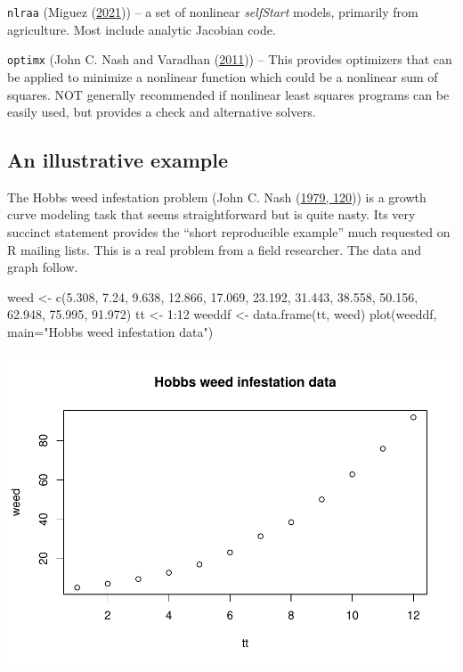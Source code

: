 \documentclass[
]{article}
\newenvironment{Shaded}{\begin{snugshade}}{\end{snugshade}}
\newcommand{\AttributeTok}[1]{\textcolor[rgb]{0.77,0.63,0.00}{#1}}
\newcommand{\DecValTok}[1]{\textcolor[rgb]{0.00,0.00,0.81}{#1}}
\newcommand{\FloatTok}[1]{\textcolor[rgb]{0.00,0.00,0.81}{#1}}
\newcommand{\FunctionTok}[1]{\textcolor[rgb]{0.00,0.00,0.00}{#1}}
\newcommand{\NormalTok}[1]{#1}
\newcommand{\OtherTok}[1]{\textcolor[rgb]{0.56,0.35,0.01}{#1}}
\newcommand{\SpecialCharTok}[1]{\textcolor[rgb]{0.00,0.00,0.00}{#1}}
\newcommand{\StringTok}[1]{\textcolor[rgb]{0.31,0.60,0.02}{#1}}
\begin{document}
\texttt{nlraa} (Miguez (\protect\hyperlink{ref-MiguezNLRAA2021}{2021}))
-- a set of nonlinear \emph{selfStart} models, primarily from
agriculture. Most include analytic Jacobian code.

\texttt{optimx} (John C. Nash and Varadhan
(\protect\hyperlink{ref-p-optimx}{2011})) -- This provides optimizers
that can be applied to minimize a nonlinear function which could be a
nonlinear sum of squares. NOT generally recommended if nonlinear least
squares programs can be easily used, but provides a check and
alternative solvers.

\hypertarget{an-illustrative-example}{%
\subsection{An illustrative example}\label{an-illustrative-example}}

The Hobbs weed infestation problem (John C. Nash
(\protect\hyperlink{ref-cnm79}{1979, 120})) is a growth curve modeling
task that seems straightforward but is quite nasty. Its very succinct
statement provides the ``short reproducible example'' much requested on
R mailing lists. This is a real problem from a field researcher. The
data and graph follow.

\begin{Shaded}
\begin{Highlighting}[]
\NormalTok{weed }\OtherTok{\textless{}{-}} \FunctionTok{c}\NormalTok{(}\FloatTok{5.308}\NormalTok{, }\FloatTok{7.24}\NormalTok{, }\FloatTok{9.638}\NormalTok{, }\FloatTok{12.866}\NormalTok{, }\FloatTok{17.069}\NormalTok{, }\FloatTok{23.192}\NormalTok{, }\FloatTok{31.443}\NormalTok{,}
          \FloatTok{38.558}\NormalTok{, }\FloatTok{50.156}\NormalTok{, }\FloatTok{62.948}\NormalTok{, }\FloatTok{75.995}\NormalTok{, }\FloatTok{91.972}\NormalTok{)}
\NormalTok{tt }\OtherTok{\textless{}{-}} \DecValTok{1}\SpecialCharTok{:}\DecValTok{12}
\NormalTok{weeddf }\OtherTok{\textless{}{-}} \FunctionTok{data.frame}\NormalTok{(tt, weed)}
\FunctionTok{plot}\NormalTok{(weeddf, }\AttributeTok{main=}\StringTok{"Hobbs weed infestation data"}\NormalTok{)}
\end{Highlighting}
\end{Shaded}

\includegraphics{ComparingNLStools_files/figure-latex/ex01-1.pdf}
\end{document}
